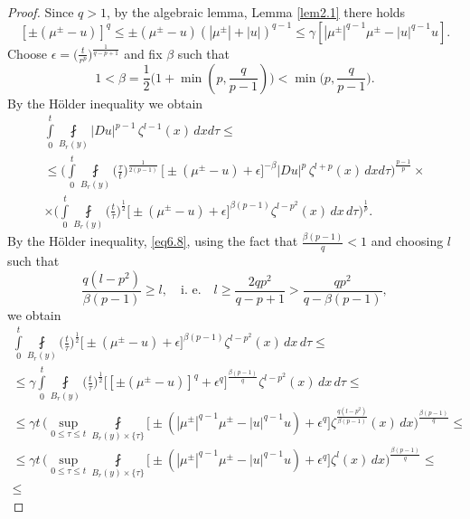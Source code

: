 \documentclass[10pt,a4paper]{amsart}
\begin{document}
\begin{proof}
Since $q> 1$, by the algebraic lemma, Lemma \ref{lem2.1} there holds
\begin{equation}\label{eq6.8}
[\pm(\mu^{\pm}-u)]^q\leqslant \pm(\mu^{\pm}-u) (|\mu^{\pm}|+|u|)^{q-1}\leqslant \gamma [|\mu^{\pm}|^{q-1}\mu^{\pm}-|u|^{q-1}u].
\end{equation}
Choose  $\epsilon=\big(\frac{t}{r^p}\big)^{\frac{1}{q-p+1}}$ and fix $\beta$ such that
$$1<\beta=\frac{1}{2}\big(1+\min(p, \frac{q}{p-1})\big)<\min\big(p, \frac{q}{p-1}\big).$$
By the H\"{o}lder inequality we obtain
\begin{multline}\label{eq6.9}
\int\limits^t_0\fint\limits_{B_{r}(y)}|D u|^{p-1}\,\zeta^{l-1}(x)\,dx d\tau\leqslant\\\leqslant\Big(\int\limits^t_0\fint\limits_{B_{ r}(y)}\Big(\frac{\tau}{t}\Big)^{\frac{1}{2(p-1)}}\,\big[\pm(\mu^{\pm}-u)+\epsilon]^{-\beta}|D u|^{p}\,\zeta^{l+p}(x)\,dx d\tau\Big)^{\frac{p-1}{p}}\times\\\times\Big(
\int\limits^t_0\fint\limits_{B_{r}(y)}\Big(\frac{t}{\tau}\Big)^{\frac{1}{2}}
\big[\pm(\mu^{\pm}-u)+\epsilon\big]^{\beta(p-1)}\zeta^{l-p^2}(x)\,dx\,d\tau\Big)^{\frac{1}{p}}.
\end{multline}
By the H\"{o}lder inequality, \eqref{eq6.8}, using the fact that $\frac{\beta (p-1)}{q} <1$ and choosing $l$ such that
$$\frac{q(l-p^2)}{\beta (p-1)}\geqslant l,\quad \text{i. e.}\quad l\geqslant \frac{2 q p^2}{q-p+1}>\frac{q p^2}{q-\beta(p-1)},$$
we obtain
\begin{multline}\label{eq6.10}
\int\limits^t_0\fint\limits_{B_{r}(y)}\Big(\frac{t}{\tau}\Big)^{\frac{1}{2}}
\big[\pm(\mu^{\pm}-u)+\epsilon\big]^{\beta(p-1)}\zeta^{l-p^2}(x)\,dx\,d\tau\leqslant\\\leqslant
\gamma \int\limits^t_0\fint\limits_{B_{r}(y)}\Big(\frac{t}{\tau}\Big)^{\frac{1}{2}}
\Big[[\pm(\mu^{\pm}-u)]^q+\epsilon^q\Big]^{\frac{\beta (p-1)}{q}}\zeta^{l-p^2}(x)\,dx\,d\tau\leqslant\\\leqslant
\gamma t\,\Big(\sup\limits_{0\leqslant \tau\leqslant t}\fint\limits_{B_{ r}(y)\times\{\tau\}}\big[\pm(|\mu^{\pm}|^{q-1}\mu^{\pm}-|u|^{q-1}u)+\epsilon^q\big]\zeta^{\frac{q (l-p^2)}{\beta (p-1)}}(x)\,dx\Big)
^{\frac{\beta (p-1)}{q}}\leqslant\\\leqslant
\gamma t\,\Big(\sup\limits_{0\leqslant \tau\leqslant t}\fint\limits_{B_{ r}(y)\times\{\tau\}}\big[\pm(|\mu^{\pm}|^{q-1}\mu^{\pm}-|u|^{q-1}u)+\epsilon^q\big]\zeta^l(x)\,dx\Big)
^{\frac{\beta (p-1)}{q}}\leqslant\\\leqslant

\end{multline}
\end{proof}
\end{document}
